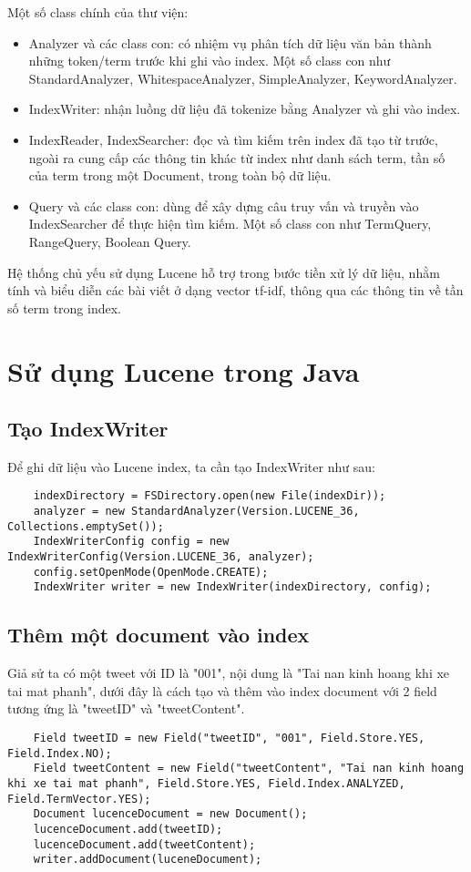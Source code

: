 Một số class chính của thư viện:
\begin{itemize}
	\item Analyzer và các class con: có nhiệm vụ phân tích dữ liệu văn bản thành những token/term trước khi ghi vào index. Một số class con như StandardAnalyzer, WhitespaceAnalyzer, SimpleAnalyzer, KeywordAnalyzer.
	\item IndexWriter: nhận luồng dữ liệu đã tokenize bằng Analyzer và ghi vào index.
	\item IndexReader, IndexSearcher: đọc và tìm kiếm trên index đã tạo từ trước, ngoài ra cung cấp các thông tin khác từ index như danh sách term, tần số của term trong một Document, trong toàn bộ dữ liệu.
	\item Query và các class con: dùng để xây dựng câu truy vấn và truyền vào IndexSearcher để thực hiện tìm kiếm. Một số class con như TermQuery, RangeQuery, Boolean Query. 
\end{itemize}

Hệ thống chủ yếu sử dụng Lucene hỗ trợ trong bước tiền xử lý dữ liệu, nhằm tính và biểu diễn các bài viết ở dạng vector tf-idf, thông qua các thông tin về tần số term trong index.

\section*{Sử dụng Lucene trong Java}
	\subsection*{Tạo IndexWriter}
	Để ghi dữ liệu vào Lucene index, ta cần tạo IndexWriter như sau:
		\begin{lstlisting}
	indexDirectory = FSDirectory.open(new File(indexDir)); 
	analyzer = new StandardAnalyzer(Version.LUCENE_36, Collections.emptySet());
	IndexWriterConfig config = new IndexWriterConfig(Version.LUCENE_36, analyzer);
	config.setOpenMode(OpenMode.CREATE);
	IndexWriter writer = new IndexWriter(indexDirectory, config);
		\end{lstlisting}
	\subsection*{Thêm một document vào index}
	Giả sử ta có một tweet với ID là "001", nội dung là "Tai nan kinh hoang khi xe tai mat phanh", dưới đây là cách tạo và thêm vào index document với 2 field tương ứng là "tweetID" và "tweetContent".
	
		\begin{lstlisting}
	Field tweetID = new Field("tweetID", "001", Field.Store.YES, Field.Index.NO);
	Field tweetContent = new Field("tweetContent", "Tai nan kinh hoang khi xe tai mat phanh", Field.Store.YES, Field.Index.ANALYZED, Field.TermVector.YES);				
	Document lucenceDocument = new Document();
	lucenceDocument.add(tweetID);
	lucenceDocument.add(tweetContent);
	writer.addDocument(luceneDocument);
		\end{lstlisting}
		
